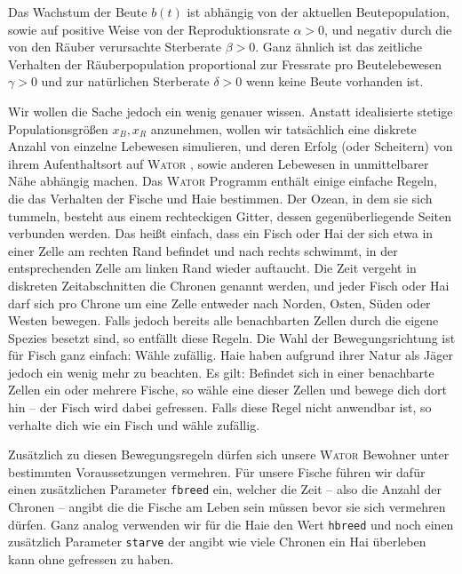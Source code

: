 \documentclass[a4paper,11pt]{article}
\newcommand{\wator}{\textsc{Wator }}
\theoremstyle{definition}
\numberwithin{equation}{section}
\begin{document}
	Das Wachstum der Beute $b(t)$ ist abhängig von der aktuellen Beutepopulation, sowie auf positive Weise von der Reproduktionsrate $\alpha > 0$, und negativ durch die von den Räuber verursachte Sterberate $\beta > 0$. Ganz ähnlich ist das zeitliche Verhalten der Räuberpopulation proportional zur Fressrate pro Beutelebewesen $\gamma > 0$ und zur natürlichen Sterberate $\delta > 0$ wenn keine Beute vorhanden ist. \newline

	Wir wollen die Sache jedoch ein wenig genauer wissen. Anstatt idealisierte stetige Populationsgrößen $x_B, x_R$ anzunehmen, wollen wir tatsächlich eine diskrete Anzahl von einzelne Lebewesen simulieren, und deren Erfolg (oder Scheitern) von ihrem Aufenthaltsort auf \wator, sowie anderen Lebewesen in unmittelbarer Nähe abhängig machen. Das \wator Programm enthält einige einfache Regeln, die das Verhalten der Fische und Haie bestimmen. Der Ozean, in dem sie sich tummeln, besteht aus einem rechteckigen Gitter, dessen gegenüberliegende Seiten verbunden werden. Das heißt einfach, dass ein Fisch oder Hai der sich etwa in einer Zelle am rechten Rand befindet und nach rechts schwimmt, in der entsprechenden Zelle am linken Rand wieder auftaucht. Die Zeit vergeht in diskreten Zeitabschnitten die Chronen genannt werden, und jeder Fisch oder Hai darf sich pro Chrone um eine Zelle entweder nach Norden, Osten, Süden oder Westen bewegen. Falls jedoch bereits alle benachbarten Zellen durch die eigene Spezies besetzt sind, so entfällt diese Regeln. Die Wahl der Bewegungsrichtung ist für Fisch ganz einfach: Wähle zufällig. Haie haben aufgrund ihrer Natur als Jäger jedoch ein wenig mehr zu beachten. Es gilt: Befindet sich in einer benachbarte Zellen ein oder mehrere Fische, so wähle eine dieser Zellen und bewege dich dort hin -- der Fisch wird dabei gefressen. Falls diese Regel nicht anwendbar ist, so verhalte dich wie ein Fisch und wähle zufällig. \newline

	Zusätzlich zu diesen Bewegungsregeln dürfen sich unsere \wator Bewohner unter bestimmten Voraussetzungen vermehren. Für unsere Fische führen wir dafür einen zusätzlichen Parameter \texttt{fbreed} ein, welcher die Zeit -- also die Anzahl der Chronen -- angibt die die Fische am Leben sein müssen bevor sie sich vermehren dürfen. Ganz analog verwenden wir für die Haie den Wert \texttt{hbreed} und noch einen zusätzlich Parameter \texttt{starve} der angibt wie viele Chronen ein Hai überleben kann ohne gefressen zu haben.
\end{document}
